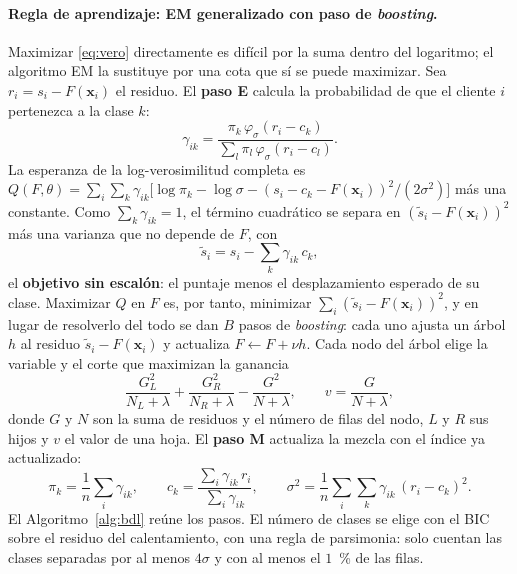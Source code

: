 \paragraph{Regla de aprendizaje: EM generalizado con paso de \emph{boosting}.}
Maximizar \eqref{eq:vero} directamente es difícil por la suma dentro del logaritmo; el algoritmo EM \citep{dempster1977}
la sustituye por una cota que sí se puede maximizar. Sea $r_i = s_i - F(\bm{x}_i)$ el residuo. El \textbf{paso E}
calcula la probabilidad de que el cliente $i$ pertenezca a la clase $k$:
\begin{equation}
  \gamma_{ik} = \frac{\pi_k\, \varphi_\sigma(r_i - c_k)}{\sum_{l} \pi_l\, \varphi_\sigma(r_i - c_l)}.
  \label{eq:paso-e}
\end{equation}
La esperanza de la log-verosimilitud completa es
$Q(F, \theta) = \sum_i \sum_k \gamma_{ik} \big[\log \pi_k - \log \sigma - (s_i - c_k - F(\bm{x}_i))^2/(2\sigma^2)\big]$
más una constante. Como $\sum_k \gamma_{ik} = 1$, el término cuadrático se separa en
$(\tilde{s}_i - F(\bm{x}_i))^2$ más una varianza que no depende de $F$, con
\begin{equation}
  \tilde{s}_i = s_i - \sum_{k} \gamma_{ik}\, c_k,
  \label{eq:sin-escalon}
\end{equation}
el \textbf{objetivo sin escalón}: el puntaje menos el desplazamiento esperado de su clase. Maximizar $Q$ en $F$ es, por
tanto, minimizar $\sum_i (\tilde{s}_i - F(\bm{x}_i))^2$, y en lugar de resolverlo del todo se dan $B$ pasos de
\emph{boosting}: cada uno ajusta un árbol $h$ al residuo $\tilde{s}_i - F(\bm{x}_i)$ y actualiza $F \leftarrow F + \nu h$.
Cada nodo del árbol elige la variable y el corte que maximizan la ganancia
\begin{equation}
  \frac{G_L^2}{N_L + \lambda} + \frac{G_R^2}{N_R + \lambda} - \frac{G^2}{N + \lambda},
  \qquad v = \frac{G}{N + \lambda},
  \label{eq:ganancia}
\end{equation}
donde $G$ y $N$ son la suma de residuos y el número de filas del nodo, $L$ y $R$ sus hijos y $v$ el valor de una hoja.
El \textbf{paso M} actualiza la mezcla con el índice ya actualizado:
\begin{equation}
  \pi_k = \frac{1}{n}\sum_i \gamma_{ik}, \qquad
  c_k = \frac{\sum_i \gamma_{ik}\, r_i}{\sum_i \gamma_{ik}}, \qquad
  \sigma^2 = \frac{1}{n}\sum_i \sum_k \gamma_{ik}\, (r_i - c_k)^2.
  \label{eq:paso-m}
\end{equation}
El Algoritmo~\ref{alg:bdl} reúne los pasos. El número de clases se elige con el BIC \citep{schwarz1978} sobre el
residuo del calentamiento, con una regla de parsimonia: solo cuentan las clases separadas por al menos $4\sigma$ y con
al menos el $1$~\% de las filas.

